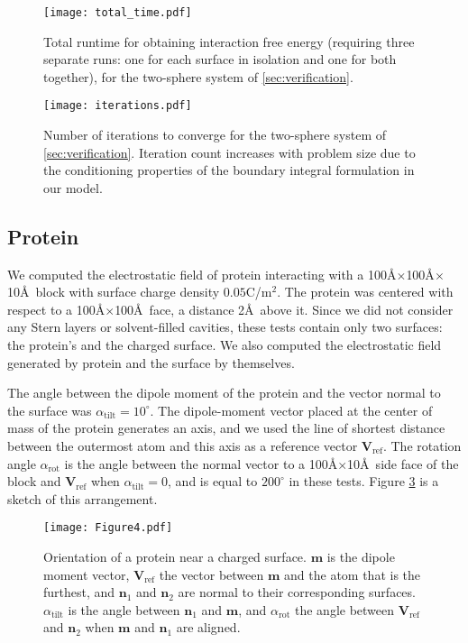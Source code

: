 \begin{figure}%
   \centering
   \texttt{[image: total\_time.pdf]} 
   \caption{Total runtime for obtaining interaction free energy (requiring three separate runs: one for each surface in isolation and one for both together), for the two-sphere system of \ref{sec:verification}.}
   \label{fig:time}
\end{figure}

\begin{figure}%
   \centering
   \texttt{[image: iterations.pdf]} 
   \caption{Number of iterations to converge for the two-sphere system of \ref{sec:verification}. Iteration count increases with problem size due to the conditioning properties of the boundary integral formulation in our model.}
   \label{fig:iterations}
\end{figure}


\subsection{Protein \gb} \label{sec:PGB}

We computed the electrostatic field of protein \gb interacting with a 100\AA$\times$100\AA$\times$10\AA\ block with surface charge density $0.05$C/m$^2$. 
The protein was centered with respect to a  100\AA$\times$100\AA\ face, a distance 2\AA\ above it. Since we did not consider any Stern layers or solvent-filled cavities, these tests contain only two surfaces: the protein's \ses and the charged surface.
We also computed the electrostatic field generated by protein \gb and the surface by themselves.

The angle between the dipole moment of the protein and the vector normal to the surface was $\alpha_\text{tilt}=10^\circ$. 
The dipole-moment vector placed at the center of mass of the protein generates an axis, and we used the line of shortest distance between the outermost atom and this axis as a reference vector $\mathbf{V}_{\text{ref}}$. 
The rotation angle $\alpha_{\text{rot}}$ is the angle between the normal vector to a 100\AA$\times$10\AA\ side face of the block and $\mathbf{V}_{\text{ref}}$ when $\alpha_\text{tilt}=0$, and is equal to $200^\circ$ in these tests. Figure \ref{fig:protein_surface} is a sketch of this arrangement.

\begin{figure}%
   \centering
   \texttt{[image: Figure4.pdf]} 
   \caption{Orientation of a protein near a charged surface. $\mathbf{m}$ is the dipole moment vector, $\mathbf{V}_\text{ref}$ the vector between $\mathbf{m}$ and the atom that is the furthest, and $\mathbf{n}_1$ and $\mathbf{n}_2$ are normal to their corresponding surfaces. $\alpha_\text{tilt}$ is the angle between $\mathbf{n}_1$ and $\mathbf{m}$, and $\alpha_\text{rot}$ the angle between $\mathbf{V}_\text{ref}$ and $\mathbf{n}_2$ when $\mathbf{m}$ and $\mathbf{n}_1$ are aligned.}
   \label{fig:protein_surface}
\end{figure}

